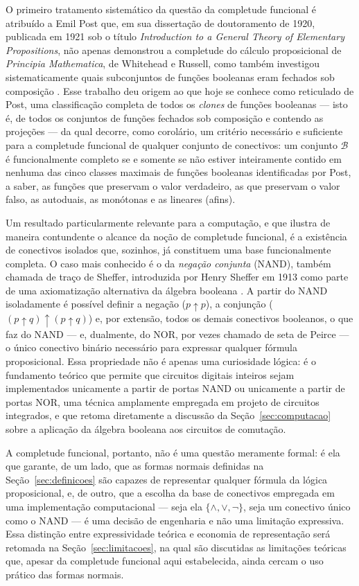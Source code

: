 \documentclass[12pt,a4paper,oneside]{report}
\theoremstyle{tituloplain}
\theoremstyle{titulodef}
\begin{document}
O primeiro tratamento sistemático da questão da completude funcional é atribuído a Emil Post que, em sua dissertação de doutoramento de 1920, publicada em 1921 sob o título \textit{Introduction to a General Theory of Elementary Propositions}, não apenas demonstrou a completude do cálculo proposicional de \textit{Principia Mathematica}, de Whitehead e Russell, como também investigou sistematicamente quais subconjuntos de funções booleanas eram fechados sob composição \cite{post1921}. Esse trabalho deu origem ao que hoje se conhece como reticulado de Post, uma classificação completa de todos os \textit{clones} de funções booleanas — isto é, de todos os conjuntos de funções fechados sob composição e contendo as projeções — da qual decorre, como corolário, um critério necessário e suficiente para a completude funcional de qualquer conjunto de conectivos: um conjunto $\mathcal{B}$ é funcionalmente completo se e somente se não estiver inteiramente contido em nenhuma das cinco classes maximais de funções booleanas identificadas por Post, a saber, as funções que preservam o valor verdadeiro, as que preservam o valor falso, as autoduais, as monótonas e as lineares (afins).
 
Um resultado particularmente relevante para a computação, e que ilustra de maneira contundente o alcance da noção de completude funcional, é a existência de conectivos isolados que, sozinhos, já constituem uma base funcionalmente completa. O caso mais conhecido é o da \textit{negação conjunta} (NAND), também chamada de traço de Sheffer, introduzida por Henry Sheffer em 1913 como parte de uma axiomatização alternativa da álgebra booleana \cite{sheffer1913}. A partir do NAND isoladamente é possível definir a negação ($p \mathbin{\uparrow} p$), a conjunção ($(p \mathbin{\uparrow} q) \mathbin{\uparrow} (p \mathbin{\uparrow} q)$) e, por extensão, todos os demais conectivos booleanos, o que faz do NAND — e, dualmente, do NOR, por vezes chamado de seta de Peirce — o único conectivo binário necessário para expressar qualquer fórmula proposicional. Essa propriedade não é apenas uma curiosidade lógica: é o fundamento teórico que permite que circuitos digitais inteiros sejam implementados unicamente a partir de portas NAND ou unicamente a partir de portas NOR, uma técnica amplamente empregada em projeto de circuitos integrados, e que retoma diretamente a discussão da Seção~\ref{sec:computacao} sobre a aplicação da álgebra booleana aos circuitos de comutação.
 
A completude funcional, portanto, não é uma questão meramente formal: é ela que garante, de um lado, que as formas normais definidas na Seção~\ref{sec:definicoes} são capazes de representar qualquer fórmula da lógica proposicional, e, de outro, que a escolha da base de conectivos empregada em uma implementação computacional — seja ela $\{\wedge, \vee, \neg\}$, seja um conectivo único como o NAND — é uma decisão de engenharia e não uma limitação expressiva. Essa distinção entre expressividade teórica e economia de representação será retomada na Seção~\ref{sec:limitacoes}, na qual são discutidas as limitações teóricas que, apesar da completude funcional aqui estabelecida, ainda cercam o uso prático das formas normais.
\end{document}
